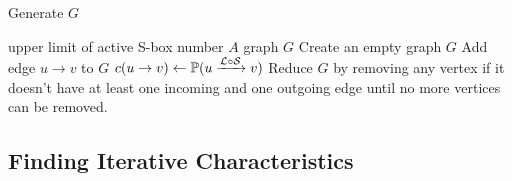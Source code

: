 


\begin{algorithm}
	\caption{Generate $G$}
	\label{algo:gen-g}
	\begin{algorithmic}[1]
		\Require upper limit of active S-box number $A$
        \Ensure graph $G$
		\Procedure {}{}
        \State Create an empty graph $G$
		\State Add edge $u\rightarrow v$ to $G$
        \State $c(u\rightarrow v)\leftarrow \mathbb{P}(u\xrightarrow{\mathcal{L}\circ\mathcal{S}}v)$
		\EndFor
		\EndIf
		\EndFor
        \State Reduce $G$ by removing any vertex if it doesn't have at least one incoming and one outgoing edge until no more vertices can be removed. 
        \State {}
		\EndProcedure
	\end{algorithmic}
\end{algorithm}



\subsection{Finding Iterative Characteristics}\label{sec:find_ite_c}


